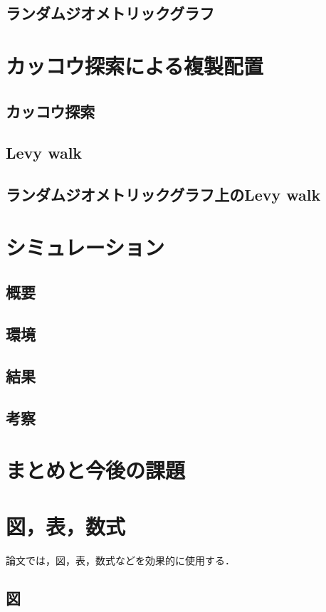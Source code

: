\documentclass[11pt]{jreport}
\begin{document}
\section{ランダムジオメトリックグラフ}

\chapter{カッコウ探索による複製配置}
\section{カッコウ探索}
\section{Levy walk}
\section{ランダムジオメトリックグラフ上のLevy walk}

\chapter{シミュレーション}
\section{概要}
\section{環境}
\section{結果}
\section{考察}

\chapter{まとめと今後の課題}

\chapter{図，表，数式}\label{chap:fig-tab-exp}

論文では，図，表，数式などを効果的に使用する．

\section{図}
\end{document}
